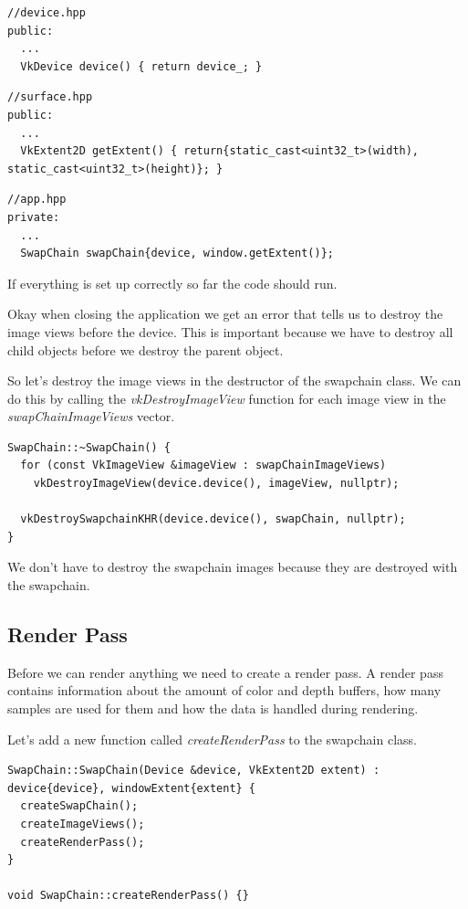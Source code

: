 \documentclass[12pt]{report} \usepackage{preamble}
\begin{document}
\begin{lstlisting}[Language=C++]
//device.hpp
public:
  ...
  VkDevice device() { return device_; }
\end{lstlisting}

\begin{lstlisting}[Language=C++]
//surface.hpp
public:
  ...
  VkExtent2D getExtent() { return{static_cast<uint32_t>(width), static_cast<uint32_t>(height)}; }
\end{lstlisting}

\begin{lstlisting}[Language=C++]
//app.hpp
private:
  ...
  SwapChain swapChain{device, window.getExtent()};
\end{lstlisting}

If everything is set up correctly so far the code should run.

Okay when closing the application we get an error that tells us to destroy the image views before the device.
This is important because we have to destroy all child objects before we destroy the parent object.

So let's destroy the image views in the destructor of the swapchain class. We can do this by calling the
\textit{vkDestroyImageView} function for each image view in the \textit{swapChainImageViews} vector.

\begin{lstlisting}[Language=C++]
SwapChain::~SwapChain() {
  for (const VkImageView &imageView : swapChainImageViews)
    vkDestroyImageView(device.device(), imageView, nullptr);

  vkDestroySwapchainKHR(device.device(), swapChain, nullptr);
}
\end{lstlisting}

We don't have to destroy the swapchain images because they are destroyed with the swapchain.

\subsection{Render Pass}

Before we can render anything we need to create a render pass. A render pass contains information about
the amount of color and depth buffers, how many samples are used for them and how the data is handled
during rendering.

Let's add a new function called \textit{createRenderPass} to the swapchain class.

\begin{lstlisting}[Language=C++]
SwapChain::SwapChain(Device &device, VkExtent2D extent) : device{device}, windowExtent{extent} {
  createSwapChain();
  createImageViews();
  createRenderPass();
}

void SwapChain::createRenderPass() {}
\end{lstlisting}
\end{document}
